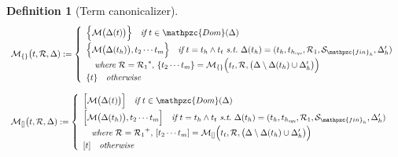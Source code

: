 \documentclass[12pt]{article}
\newtheorem{Definition}{Definition}[section]
\begin{document}
\begin{Definition}[Term canonicalizer]
  \begin{displaymath}
    \begin{array}{l}
    \mathcal{M}_{\{\}}\bigl(t, \mathcal{R},\Delta) :=
     \left\{\begin{array}{l}
       \Bigl\{\mathcal{M}\bigl(\Delta(t) \bigr) \Bigr\}
        \quad \text{\it if}\ t \in \mathpzc{Dom}(\Delta)  \\ [5pt]
       \Bigl\{\mathcal{M}\bigl(\Delta(t_h) \bigr), t_2 \cdots t_m \Bigr\}
        \quad \text{\it if}\ t = t_h \wedge t_t\ \text{\it s.t.}\
         \Delta(t_h) = (t_h, t_{h_{\text{\it equ}}}, \mathcal{R}_1,
          \mathcal{S}_{\mathpzc{fin}_h}, \Delta'_h)  \\
       \quad \text{\it where}\ \mathcal{R} = {\mathcal{R}_1}^*,\,
        \{t_2 \cdots t_m\} =
         \mathcal{M}_{\{\}}\Bigl(t_t, \mathcal{R}, \bigl(\Delta \setminus
          \Delta(t_h) \cup \Delta'_h \bigr) \Bigr)  \\
       \{t\} \quad \text{\it otherwise}
     \end{array}\right.  \\
     \\
     
     \mathcal{M}_{[]}\bigl(t, \mathcal{R},\Delta) :=
     \left\{\begin{array}{l}
       \Bigl[\mathcal{M}\bigl(\Delta(t) \bigr) \Bigr]
        \quad \text{\it if}\ t \in \mathpzc{Dom}(\Delta)  \\ [5pt]
       \Bigl[\mathcal{M}\bigl(\Delta(t_h) \bigr), t_2 \cdots t_m \Bigr]
        \quad \text{\it if}\ t = t_h \wedge t_t\ \text{\it s.t.}\
         \Delta(t_h) = (t_h, t_{h_{\text{\it equ}}}, \mathcal{R}_1,
          \mathcal{S}_{\mathpzc{fin}_h}, \Delta'_h)  \\
       \quad \text{\it where}\ \mathcal{R} = {\mathcal{R}_1}^+,\,
        [t_2 \cdots t_m] =
         \mathcal{M}_{[]}\Bigl(t_t, \mathcal{R}, \bigl(\Delta \setminus
          \Delta(t_h) \cup \Delta'_h \bigr) \Bigr)  \\
       {[}t{]} \quad \text{\it otherwise}
     \end{array}\right.  \\
     \\
     

\end{array}
\end{displaymath}
\end{Definition}
\end{document}
